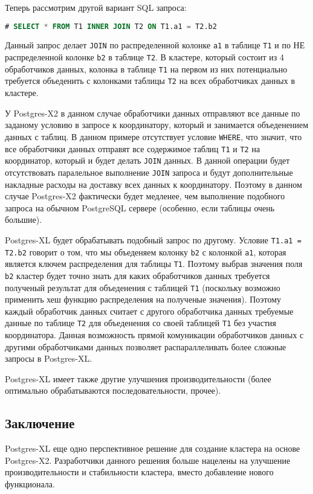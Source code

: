 Теперь рассмотрим другой вариант SQL запроса:

\begin{lstlisting}[language=SQL,label=lst:postgres-xl1,caption=Запрос на распределенные таблицы]
# SELECT * FROM T1 INNER JOIN T2 ON T1.a1 = T2.b2
\end{lstlisting}

Данный запрос делает \lstinline!JOIN! по распределенной колонке \lstinline!a1! в таблице \lstinline!T1! и по НЕ распределенной колонке \lstinline!b2! в таблице \lstinline!T2!. В кластере, который состоит из 4 обработчиков данных, колонка в таблице \lstinline!T1! на первом из них потенциально требуется объеденить с колонками таблицы \lstinline!T2! на всех обработчиках данных в кластере.

У Postgres-X2 в данном случае обработчики данных отправляют все данные по заданому условию в запросе к координатору, который и занимается объеденением данных с таблиц. В данном примере отсутствует условие \lstinline!WHERE!, что значит, что все обработчики данных отправят все содержимое таблиц \lstinline!T1! и \lstinline!T2! на координатор, который и будет делать \lstinline!JOIN! данных. В данной операции будет отсутствовать паралельное выполнение \lstinline!JOIN! запроса и будут дополнительные накладные расходы на доставку всех данных к координатору. Поэтому в данном случае Postgres-X2 фактически будет медленее, чем выполнение подобного запроса на обычном PostgreSQL сервере (особенно, если таблицы очень большие).

Postgres-XL будет обрабатывать подобный запрос по другому. Условие \lstinline!T1.a1 = T2.b2! говорит о том, что мы объеденяем колонку \lstinline!b2! с колонкой \lstinline!a1!, которая является ключем распределения для таблицы \lstinline!T1!. Поэтому выбрав значения поля \lstinline!b2! кластер будет точно знать для каких обработчиков данных требуется полученый результат для объеденения с таблицей \lstinline!T1! (поскольку возможно применить хеш функцию распределения на полученые значения). Поэтому каждый обработчик данных считает с другого обработчика данных требуемые данные по таблице \lstinline!T2! для объеденения со своей таблицей \lstinline!T1! без участия координатора. Данная возможность прямой комуникации обработчиков данных с другими обработчиками данных позволяет распараллеливать более сложные запросы в Postgres-XL.

Postgres-XL имеет также другие улучшения производительности (более оптимально обрабатываются последовательности, прочее).


\subsection{Заключение}

Postgres-XL еще одно перспективное решение для создание кластера на основе Postgres-X2. Разработчики данного решения больше нацелены на улучшение производительности и стабильности кластера, вместо добавление нового функционала.

